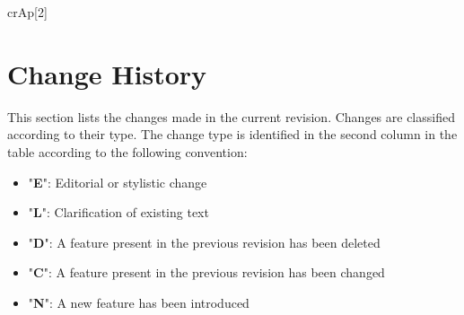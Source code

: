 \documentclass{pnp_article}
\begin{document}
\maketitle

\tableofcontents
\listoffigures
\listoftables

\newenvironment{crReq}[2]
{
\pnpcsvtable[filter equal={\Domain}{#1}]{|l|p{11.8cm}|}{#2}{tab:Req-#1}{\textbf{Req. ID} & \textbf{Requirement Text}}{CrFwRequirement.csv}{\Domain-\Name/\Kind & \textit{\Text}}
}

\newenvironment{crAp}[2]
{
}






\section{Change History}

This section lists the changes made in the current revision. Changes are classified according to their type. The change type is identified in the second column in the table according to the following convention:

\begin{itemize}
\item "\textbf{E}": Editorial or stylistic change
\item "\textbf{L}": Clarification of existing text
\item "\textbf{D}": A feature present in the previous revision has been deleted
\item "\textbf{C}": A feature present in the previous revision has been changed
\item "\textbf{N}": A new feature has been introduced
\end{itemize}
\end{document}

